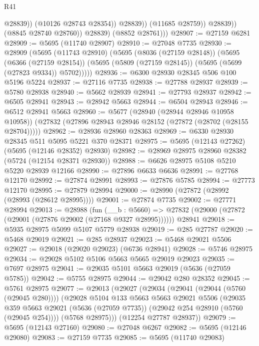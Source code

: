 \begin{lexlean}{R41}
\begin{coremodule}
                            @28839))
                        (@10126 @28743 @28354))
                      @28839))
                  (@11685 @28759))
                @28839))
            (@8845 @28740 @28760))
          @28839)
        (@8852 @28761)))
@28907 := @27159 @6281
@28909 := @5695 (@11740 @28907)
@28910 := @27048 @7735
@28930 := @28909
    (@5695
      (@11743 @28910)
      (@5695
        (@8036 (@27159 @28148))
        (@5695
          (@6366 (@27159 @28154))
          (@5695 (@5809 (@27159 @28145)) (@5695 (@5699 (@27823 @9334)) @5702)))))
@28936 := @6300 @28930 @28345 @506 @100 @5196 @5224
@28937 := @27116 @7735
@28938 := @27788 @28937
@28939 := @5780 @28938
@28940 := @5662 @28939
@28941 := @27793 @28937
@28942 := @6505 @28941
@28943 := @28942 @5663
@28944 := @6504 @28943
@28946 := @6512 @28941 @5663
@28960 := @5677
    (@28940 (@28944 @28946 @10958 @10958))
    (@27832 (@27896 @28943 @28946 @28152 (@27872 (@28702 (@28155 @28704)))))
@28962 := @28936 @28960 @28363
@28969 := @6330 @28930 @28345 @511 @5095 @5221 @370 @28371
@28975 := @5695 (@12143 @27262) (@5695 (@12146 @28352) @28930)
@28982 := @28969 @28975 @28960 @28382 (@5724 (@12154 @28371 @28930))
@28988 := @6626 @28975 @5108 @5210 @5220 @28939 @12166
@28990 := @27896 @6633 @6636
@28991 := @27768 @12170
@28992 := @27874 @28991
@28993 := @27876 @5785
@28994 := @27773 @12170
@28995 := @27879 @28994
@29000 := @28990 (@27872 (@28992 (@28993 (@28612 @28995))))
@29001 := @27874 @7735
@29002 := @27771 @28994
@29013 := @28988
    (fun (__b : @5660) => @27832 (@29000 (@27872 (@29001 (@27876 @29002 (@27168 @9327 @28995))))))
    @28941
@29018 := @5935 @28975 @5099 @5107 @5779 @28938
@29019 := @285 @27787
@29020 := @5468 @29019
@29021 := @285 @28937
@29023 := @5468 @29021 @5506
@29027 := @29018 (@29020 @29023) (@6736 @28941)
@29028 := @5746 @28975
@29034 := @29028 @5102 @5106 @5663 @5665 @29019 @29023
@29035 := @7697 @28975
@29041 := @29035 @5101 @5663 @29019 (@5636 (@27059 @5785))
@29042 := @5755 @28975
@29044 := @29042 @280 @28352
@29045 := @5761 @28975
@29077 := @29013
    (@29027
      (@29034
        (@29041 (@29044 (@5760 (@29045 @280))))
        (@29028
          @5104
          @133
          @5663
          @5663
          @29021
          @5506
          (@29035
            @359
            @5663
            @29021
            (@5636 (@27059 @7735))
            (@29042 @254 @28910 (@5760 (@29045 @254))))
          (@5768 @28975)))
      (@12254 @27787 @28937))
@29079 := @5695 (@12143 @27160)
@29080 := @27048 @6267
@29082 := @5695 (@12146 @29080)
@29083 := @27159 @7735
@29085 := @5695 (@11740 @29083)

\end{coremodule}
\end{lexlean}
